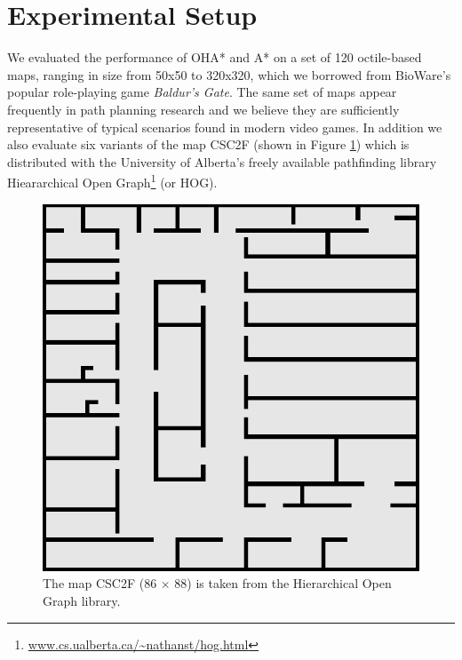 \section{Experimental Setup}
We evaluated the performance of OHA* and A* on a set of 120 octile-based maps, ranging in size from 50x50 
to 320x320, which we borrowed from BioWare's popular role-playing game \emph{Baldur's Gate}. 
The same set of maps appear frequently in path planning research 
\cite{botea04,bjornsson05,bjornsson06,harabor08} and we believe they are sufficiently representative 
of typical scenarios found in modern video games.
In addition we also evaluate six variants of the map CSC2F (shown in Figure \ref{fig-csc2f}) which is distributed with the University of Alberta's freely available pathfinding library 
Hieararchical Open Graph\footnote{\url{www.cs.ualberta.ca/~nathanst/hog.html}} (or HOG).

\begin{figure}[htbp]
	\vspace{-4pt}
       \begin{center}
                       \includegraphics[scale=0.33, trim = 20mm 20mm 20mm 0mm]{diagrams/csc2f.png}
       \end{center}
	\vspace{-3pt}
       \caption{The map CSC2F (86 $\times$ 88) is taken from the  \newline
				Hierarchical Open Graph library.}
       \label{fig-csc2f}
	\vspace{-12pt}
\end{figure}

